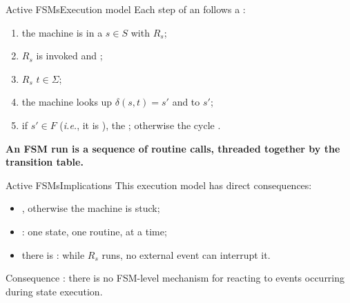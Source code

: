 \begin{frame}{Active FSMs}{Execution model}
  \justifying
  Each step of an  follows a :
  \begin{enumerate}
    \item the machine is in a  $s \in S$ with  $R_s$;
    \item $R_s$ is invoked and ;
    \item $R_s$  $t \in \Sigma$;
    \item the machine looks up $\delta(s, t) = s'$ and  to $s'$;
    \item if $s' \in F$ (\emph{i.e.}, it is ), the ; otherwise the cycle .
  \end{enumerate}
  \bigskip
  \begin{block}{}
    \centering
    \textbf{An FSM run is a sequence of routine calls, threaded together by the transition table.}
  \end{block}
\end{frame}
\begin{frame}{Active FSMs}{Implications}
  \justifying
  This execution model has direct consequences:
  \begin{itemize}
    \item {}, otherwise the machine is stuck;
    \item {}: one state, one routine, at a time;
    \item there is : while $R_s$ runs, no external event can interrupt it.
  \end{itemize}
  \bigskip
  \begin{alertblock}{Consequence}
    \justifying
    : there is no FSM-level mechanism for reacting to events occurring during state execution.
  \end{alertblock}
\end{frame}

